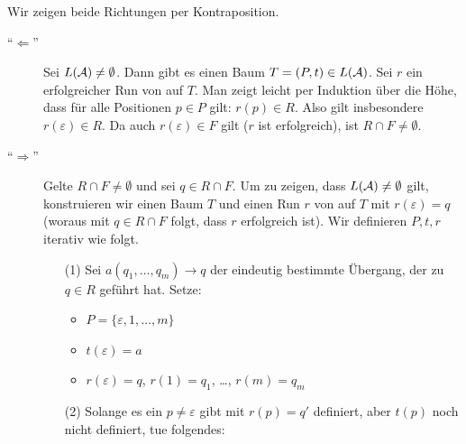 \documentclass[fontsize=11pt, twoside=false, numbers=autoenddot]{scrbook}
\begin{document}
\parII
\begin{beweis}
  Wir zeigen beide Richtungen per Kontraposition.
  \begin{description}
    \item[{\boldmath "`$\Leftarrow$"'}]
      Sei $L(\mathcal{A}) \neq \emptyset$.
      Dann gibt es einen Baum $T=(P,t) \in L(\mathcal{A})$.
      Sei $r$ ein erfolgreicher Run von \Amc auf $T$.
      Man zeigt leicht per Induktion über die Höhe,
      dass für alle Positionen $p \in P$ gilt: $r(p) \in R$.
      Also gilt insbesondere $r(\varepsilon) \in R$.
      Da auch $r(\varepsilon) \in F$ gilt ($r$ ist erfolgreich),
      ist $R \cap F \neq \emptyset$.
    \item[{\boldmath "`$\Rightarrow$"'}]
      Gelte $R \cap F \neq \emptyset$ und sei $q \in R \cap F$.
      Um zu zeigen, dass $L(\mathcal{A}) \neq \emptyset$ gilt,
      konstruieren wir einen Baum $T$
      und einen Run $r$ von \Amc auf $T$
      mit $r(\varepsilon) = q$ (woraus mit $q \in R \cap F$ folgt,
      dass $r$ erfolgreich ist).
      Wir definieren $P,t,r$ iterativ wie folgt.
      \begin{enumerate}
        \item[(1)]
          Sei $a(q_1,\dots,q_m) \to q$ der eindeutig bestimmte Übergang,
          der zu $q \in R$ geführt hat. Setze:
          \begin{itemize}
            \item
              $P = \{\varepsilon,1,\dots,m\}$
            \item
              $t(\varepsilon)=a$
            \item 
              $r(\varepsilon) = q$, $r(1)=q_1$, \dots, $r(m) = q_m$
          \end{itemize}
        \item[(2)]
          Solange es ein $p \neq \varepsilon$ gibt
          mit $r(p) = q'$ definiert, aber $t(p)$ noch nicht definiert, tue folgendes:
          

\end{enumerate}
\end{description}
\end{beweis}
\end{document}
